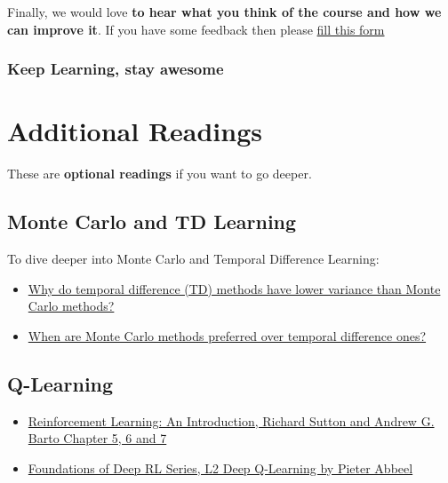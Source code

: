 \documentclass[11pt,a4paper]{article}
\begin{document}

Finally, we would love \textbf{to hear what you think of the course and how we can improve it}. If you have some feedback then please \href{https://forms.gle/BzKXWzLAGZESGNaE9}{fill this form}

\subsubsection{Keep Learning, stay awesome}\label{keep-learning-stay-awesome-1}

\section{Additional Readings}\label{additional-readings}

These are \textbf{optional readings} if you want to go deeper.

\subsection{Monte Carlo and TD Learning}\label{monte-carlo-and-td-learning}

To dive deeper into Monte Carlo and Temporal Difference Learning:

\begin{itemize}
\tightlist
\item
  \href{https://stats.stackexchange.com/questions/355820/why-do-temporal-difference-td-methods-have-lower-variance-than-monte-carlo-met}{Why do temporal difference (TD) methods have lower variance than Monte Carlo methods?}
\item
  \href{https://stats.stackexchange.com/questions/336974/when-are-monte-carlo-methods-preferred-over-temporal-difference-ones}{When are Monte Carlo methods preferred over temporal difference ones?}
\end{itemize}

\subsection{Q-Learning}\label{q-learning}

\begin{itemize}
\tightlist
\item
  \href{http://incompleteideas.net/book/RLbook2020.pdf}{Reinforcement Learning: An Introduction, Richard Sutton and Andrew G. Barto Chapter 5, 6 and 7}
\item
  \href{https://youtu.be/Psrhxy88zww}{Foundations of Deep RL Series, L2 Deep Q-Learning by Pieter Abbeel}
\end{itemize}
\end{document}
